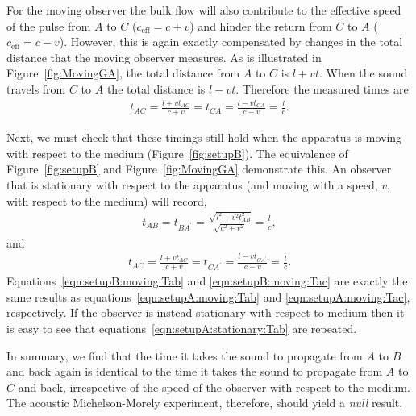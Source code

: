 \documentclass[10pt, fleqn,final,showtrims,oldfontcommands, article,a4paper,oneside]{memoir} %
\newcommand{\figref}[1]{Figure~\ref{fig:#1}}
\newcommand{\eff}{{\textrm{eff}}}
\begin{document}
For the moving observer the bulk flow will also contribute to the effective speed of the pulse from $A$ to $C$  ($c_\eff = c+v$) 
and hinder  the return from $C$ to $A$ ($c_\eff = c-v$).
However, this is again exactly compensated by changes in the total distance that the moving observer measures.
As is illustrated in \figref{MovingGA}, the total distance from $A$ to $C$ is $l+vt$. %
When the sound travels from $C$ to $A$ the total  distance is $l-vt$. %
%
Therefore the measured times are
\begin{align}
  \label{eqn:setupA:moving:Tac}
  t_{AC} =  \frac{l+vt_{AC}}{c+v}= t_{CA} =  \frac{l-vt_{CA}}{c-v}= \frac{l}{c}.
\end{align}

Next, we must check that these timings still hold when the apparatus is moving with respect to the medium (\figref{setupB}).
The equivalence of \figref{setupB} and \figref{MovingGA} demonstrate this.
An observer that is stationary with respect to the apparatus (and moving with a speed, $v$, with respect to the medium) will record,
\begin{align}
  \label{eqn:setupB:moving:Tab}
  t_{AB} = t_{BA^\prime} =  \frac{\sqrt{l^2+v^2t_{AB}^2}}{\sqrt{c^2 +v^2}} = \frac{l}{c},
\end{align}
and 
\begin{align}
  \label{eqn:setupB:moving:Tac}
  t_{AC} =  \frac{l+vt_{AC}}{c+v}= t_{CA^\prime} =  \frac{l-vt_{CA^\prime}}{c-v}= \frac{l}{c}.
\end{align}
Equations~\ref{eqn:setupB:moving:Tab} and \ref{eqn:setupB:moving:Tac}  are exactly the same results as equations~\ref{eqn:setupA:moving:Tab} and \ref{eqn:setupA:moving:Tac},
respectively.
If the observer is instead stationary with respect to medium then it is easy to see that equations~\ref{eqn:setupA:stationary:Tab}  are repeated.

In summary, we find that the time it takes the sound to propagate from $A$ to $B$ and back again is
identical to the time it takes the sound to propagate from $A$ to $C$ and back,
irrespective of the speed of the observer with respect to the medium.
The acoustic Michelson-Morely experiment, therefore, should yield a  {\em null} result.
\end{document}
